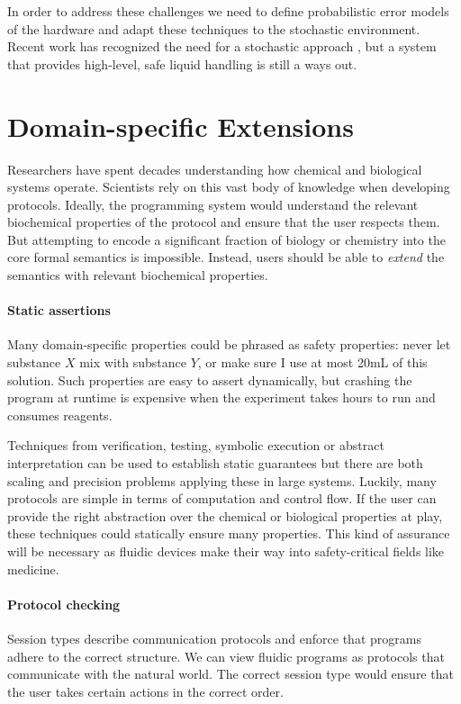 \documentclass[
  10pt,
  a4paper,
  twocolumn,
]{article}
\begin{document}
In order to address these challenges we need to define probabilistic error models of the hardware and adapt these techniques
to the stochastic environment. Recent work has recognized the need for a stochastic approach \cite{bioprotocols}, but a system
that provides high-level, safe liquid handling is still a ways out.

\section*{Domain-specific Extensions}

Researchers have spent decades understanding how chemical and biological systems operate.
Scientists rely on this vast body of knowledge when developing protocols.
Ideally, the programming system would understand the relevant biochemical properties of the protocol and
ensure that the user respects them.
But attempting to encode a significant fraction of biology or chemistry into the core
formal semantics is impossible.
Instead, users should be able to \emph{extend} the semantics with relevant biochemical properties.

\paragraph{Static assertions}
Many domain-specific properties could be phrased as safety properties: never let substance $X$ mix with substance $Y$, or make sure I use at most 20mL of this solution. Such properties are easy to assert dynamically, but crashing the program at runtime is expensive when the experiment takes hours to run and consumes reagents.

Techniques from verification, testing, symbolic execution or abstract interpretation can be used to establish static guarantees but there are both scaling and precision problems applying these in large systems. Luckily, many protocols are simple in terms of computation and control flow. If the user can provide the right abstraction over the chemical or biological properties at play, these techniques could statically ensure many properties. This kind of assurance will be necessary as fluidic devices make their way into safety-critical fields like medicine.

\paragraph{Protocol checking}
Session types \cite{Honda1993} describe communication protocols and enforce that programs adhere to the correct structure.
We can view  fluidic programs as protocols that communicate with the natural world.
The correct session type would  ensure that the user takes certain actions in the correct order.
\end{document}
